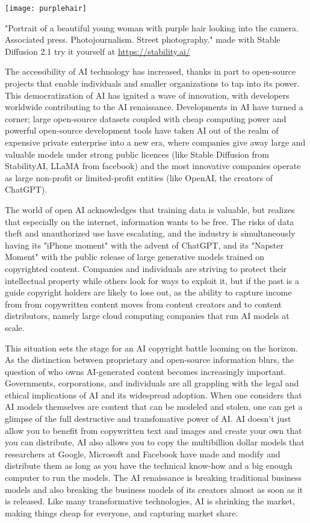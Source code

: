 \begin{marginfigure}[-5.5cm]
    \texttt{[image: purplehair]}
        \caption{"Portrait of a beautiful young woman with purple hair looking into the camera. Associated press. Photojournalism. Street photography." made with Stable Diffusion 2.1 try it yourself at \url{https://stability.ai/}}
\end{marginfigure}

The accessibility of AI technology has increased, thanks in part to open-source projects that enable individuals and smaller organizations to tap into its power. This democratization of AI has ignited a wave of innovation, with developers worldwide contributing to the AI renaissance. Developments in AI have turned a corner; large open-source datasets coupled with cheap computing power and powerful open-source development tools have taken AI out of the realm of expensive private enterprise into a new era, where companies give away large and valuable models under strong public licences (like Stable Diffusion from StabilityAI, LLaMA from facebook) and the most innovative companies operate as large non-profit or limited-profit entities (like OpenAI, the creators of ChatGPT).   


The world of open AI acknowledges that training data is valuable, but realizes that especially on the internet, information wants to be free.  The risks of data theft and unauthorized use have escalating, and the industry is simultaneously having its "iPhone moment" with the advent of ChatGPT, and its "Napster Moment" with the public release of large generative models trained on copyrighted content. Companies and individuals are striving to protect their intellectual property while others look for ways to exploit it, but if the past is a guide copyright holders are likely to lose out, as the ability to capture income from from copywritten content moves from content creators and to content distributors, namely large cloud computing companies that run AI models at scale.

This situation sets the stage for an AI copyright battle looming on the horizon. As the distinction between proprietary and open-source information blurs, the question of who owns AI-generated content becomes increasingly important. Governments, corporations, and individuals are all grappling with the legal and ethical implications of AI and its widespread adoption. When one considers that AI models themselves are content that can be modeled and stolen, one can get a glimpse of the full destructive and transfomative power of AI. AI doesn't just allow you to benefit from copywritten text and images and create your own that you can distribute, AI also allows you to copy the multibillion dollar models that researchers at Google, Microsoft and Facebook have made and modify and distribute them as long as you have the technical know-how and a big enough computer to run the models. The AI renaissance is breaking traditional business models and also breaking the business models of its creators almost as soon as it is released. Like many transformative technologies, AI is shrinking the market, making things cheap for everyone, and capturing market share.

